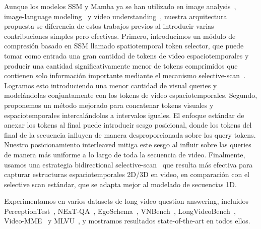 Aunque los modelos SSM y Mamba ya se han utilizado en image analysis~\cite{zhu2024vision, pei2024efficientvmamba, pei2024efficientvmamba, chen2024rsmamba}, image-language modeling~\cite{qiao2024vl,zhao2024cobra, huang2024clip, lee2024meteor} y video understanding~\cite{yang2024vivim,li2025videomamba,lu2024videomambapro,chaudhuri2024simba,islam2022long,islam2023efficient}, nuestra arquitectura propuesta se diferencia de estos trabajos previos al introducir varias contribuciones simples pero efectivas. Primero, introducimos un módulo de compresión basado en SSM llamado spatiotemporal token selector, que puede tomar como entrada una gran cantidad de tokens de video espaciotemporales y producir una cantidad significativamente menor de tokens comprimidos que contienen solo información importante mediante el mecanismo selective-scan~\cite{gu2023mamba}. Logramos esto introduciendo una menor cantidad de visual queries y modelándolas conjuntamente con los tokens de video espaciotemporales. Segundo, proponemos un método mejorado para concatenar tokens visuales y espaciotemporales intercalándolos a intervalos iguales. El enfoque estándar de anexar los tokens al final puede introducir sesgo posicional, donde los tokens del final de la secuencia influyen de manera desproporcionada sobre los query tokens. Nuestro posicionamiento interleaved mitiga este sesgo al influir sobre las queries de manera más uniforme a lo largo de toda la secuencia de video. Finalmente, usamos una estrategia bidirectional selective-scan~\cite{li2025videomamba} que resulta más efectiva para capturar estructuras espaciotemporales 2D/3D en video, en comparación con el selective scan estándar, que se adapta mejor al modelado de secuencias 1D.


Experimentamos en varios datasets de long video question answering, incluidos PerceptionTest~\cite{patraucean2024perception}, NExT-QA~\cite{xiao2021next}, EgoSchema~\cite{mangalam2023egoschema}, VNBench~\cite{zhao2024needle}, LongVideoBench~\cite{wu2024longvideobench}, Video-MME~\cite{fu2024video} y MLVU~\cite{zhou2024mlvu}, y mostramos resultados state-of-the-art en todos ellos.
